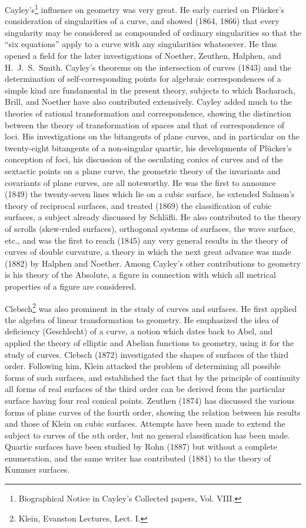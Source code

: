 \documentclass[oneside]{book}
\begin{document}
Cayley's\footnote{Biographical Notice in Cayley's Collected papers,
Vol. VIII.} influence on geometry was very great. He early carried
on Pl\"ucker's consideration of singularities of a curve, and showed
(1864, 1866) that every singularity may be considered as compounded
of ordinary singularities so that the ``six equations'' apply to a
curve with any singularities whatsoever. He thus opened a field for
the later investigations of Noether, Zeuthen, Halphen, and
H.~J.~S.~Smith. Cayley's theorems on the intersection of curves
(1843) and the determination of self-corresponding points for
algebraic correspondences of a simple kind are fundamental in the
present theory, subjects to which Bacharach, Brill, and Noether have
also contributed extensively. Cayley added much to the theories of
rational transformation and correspondence, showing the distinction
between the theory of transformation of spaces and that of
correspondence of loci. His investigations on the bitangents of
plane curves, and in particular on the twenty-eight bitangents of a
non-singular quartic, his developments of Pl\"ucker's conception of
foci, his discussion of the osculating conics of curves and of the
sextactic points on a plane curve, the geometric theory of the
invariants and covariants of plane curves, are all noteworthy. He
was the first to announce (1849) the twenty-seven lines which lie on
a cubic surface, he extended Salmon's theory of reciprocal surfaces,
and treated (1869) the classification of cubic surfaces, a subject
already discussed by Schl\"afli. He also contributed to the theory
of scrolls (skew-ruled surfaces), orthogonal systems of surfaces,
the wave surface, etc., and was the first to reach (1845) any very
general results in the theory of curves of double curvature, a
theory in which the next great advance was made (1882) by Halphen
and Noether. Among Cayley's other contributions to geometry is his
theory of the Absolute, a figure in connection with which all
metrical properties of a figure are considered.

Clebsch\footnote{Klein, Evanston Lectures, Lect. I.} was also
prominent in the study of curves and surfaces. He first applied the
algebra of linear transformation to geometry. He emphasized the idea
of deficiency (Geschlecht) of a curve, a notion which dates back to
Abel, and applied the theory of elliptic and Abelian functions to
geometry, using it for the study of curves. Clebsch (1872)
investigated the shapes of surfaces of the third order. Following
him, Klein attacked the problem of determining all possible forms of
such surfaces, and established the fact that by the principle of
continuity all forms of real surfaces of the third order can be
derived from the particular surface having four real conical
points. Zeuthen (1874) has discussed the various forms of plane
curves of the fourth order, showing the relation between his results
and those of Klein on cubic surfaces. Attempts have been made to
extend the subject to curves of the $n$th order, but no general
classification has been made. Quartic surfaces have been studied by
Rohn (1887) but without a complete enumeration, and the same writer
has contributed (1881) to the theory of Kummer surfaces.
\end{document}
